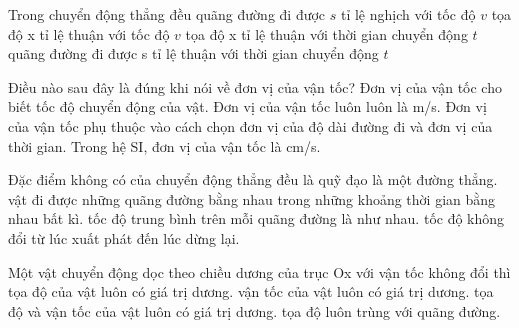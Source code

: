 \begin{ex}
Trong chuyển động thẳng đều
\choice
{quãng đường đi được $s$ tỉ lệ nghịch với tốc độ $v$}
{tọa độ x tỉ lệ thuận với tốc độ $v$}
{tọa độ x tỉ lệ thuận với thời gian chuyển động $t$}
{\True quãng đường đi được s tỉ lệ thuận với thời gian chuyển động $t$}
\end{ex}

\begin{ex}
Điều nào sau đây là đúng khi nói về đơn vị của vận tốc?
\choice
{Đơn vị của vận tốc cho biết tốc độ chuyển động của vật.}
{Đơn vị của vận tốc luôn luôn là m/s.}
{\True Đơn vị của vận tốc phụ thuộc vào cách chọn đơn vị của độ dài đường đi và đơn vị của thời gian.}
{Trong hệ SI, đơn vị của vận tốc là cm/s.}
\end{ex}

\begin{ex}
Đặc điểm không có của chuyển động thẳng đều là
\choice
{quỹ đạo là một đường thẳng.}
{vật đi được những quãng đường bằng nhau trong những khoảng thời gian bằng nhau bất kì.}
{tốc độ trung bình trên mỗi quãng đường là như nhau.}
{\True tốc độ không đổi từ lúc xuất phát đến lúc dừng lại.}
\end{ex}

\begin{ex}
Một vật chuyển động dọc theo chiều dương của trục Ox với vận tốc không đổi thì
\choice
{tọa độ của vật luôn có giá trị dương.}
{\True vận tốc của vật luôn có giá trị dương.}
{tọa độ và vận tốc của vật luôn có giá trị dương.}
{tọa độ luôn trùng với quãng đường.}
\end{ex}

